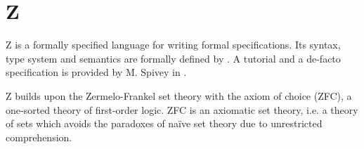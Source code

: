 \section*{Z}


Z is a formally specified language for writing formal specifications. Its
syntax, type system and semantics are formally defined by \cite{iso-z}. A
tutorial and a de-facto specification is provided by M. Spivey in \cite{zrm}.

Z builds upon the Zermelo-Frankel set theory with the axiom of choice (ZFC), a
one-sorted theory of first-order logic. ZFC is an axiomatic set theory, i.e. a
theory of sets which avoids the paradoxes of na\"ive set theory due to
unrestricted comprehension.

